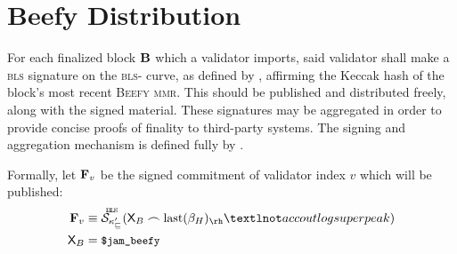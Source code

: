 \section{Beefy Distribution}\label{sec:beefy}

For each finalized block $\mathbf{B}$ which a validator imports, said validator shall make a \textsc{bls} signature on the \textsc{bls}- curve, as defined by \cite{bls12-381}, affirming the Keccak hash of the block's most recent \textsc{Beefy} \textsc{mmr}. This should be published and distributed freely, along with the signed material. These signatures may be aggregated in order to provide concise proofs of finality to third-party systems. The signing and aggregation mechanism is defined fully by \cite{cryptoeprint:2022/1611}.

Formally, let $\mathbf{F}_{v}$ be the signed commitment of validator index $v$ which will be published:
\begin{align}\label{eq:beefysignedcommitment}
  \beefycommitment{v} &\equiv \blssigndata{\activeset'\sub{v}}{\Xbeefy \concat \text{last}(\recenthistory)_\rh¬accoutlogsuperpeak}\\
  \Xbeefy &= \token{\$jam\_beefy}
\end{align}
